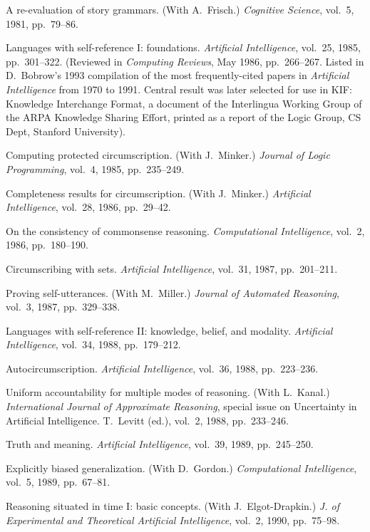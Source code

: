 \paper
A re-evaluation of story grammars.
(With A.~Frisch.)
{\sl Cognitive Science},
vol.~5, 1981, pp.~79--86.

\paper{}
Languages with self-reference I: foundations.
{\sl Artificial Intelligence},
vol.~25, 1985, pp.~301--322.
(Reviewed in {\sl Computing Reviews}, May 1986, pp.~266--267.
Listed in D.~Bobrow's 1993 compilation
of the most frequently-cited papers in {\sl Artificial Intelligence}
from 1970 to 1991. Central result was later selected for use in KIF:
Knowledge Interchange Format, a document of the Interlingua Working
Group of the ARPA Knowledge Sharing Effort, printed as a report of
the Logic Group, CS Dept, Stanford University).

\paper{}
Computing protected circumscription.
(With J.~Minker.)
{\sl Journal of Logic Programming}, vol.~4, 1985, pp.~235--249.

\paper{}
Completeness results for circumscription.
(With J.~Minker.)
{\sl Artificial Intelligence}, vol.~28, 1986, pp.~29--42.

\paper{}
On the consistency of commonsense reasoning.
{\sl Computational Intelligence},
vol.~2, 1986, pp.~180--190.

\paper
Circumscribing with sets.
{\sl Artificial Intelligence},
vol.~31, 1987, pp.~201--211.

\paper
Proving self-utterances.
(With M.~Miller.)
{\sl Journal of Automated Reasoning}, 
vol.~3, 1987, pp.~329--338.

\paper{}
Languages with self-reference II: knowledge, belief, and modality.
{\sl Artificial Intelligence},
vol.~34, 1988, pp.~179--212.

\paper
Autocircumscription.
{\sl Artificial Intelligence},
vol.~36, 1988, pp.~223--236.

\paper
Uniform accountability for multiple modes of reasoning.
(With L.~Kanal.)
{\sl International Journal of Approximate Reasoning},
special issue on Uncertainty in Artificial Intelligence. T.~Levitt (ed.),
vol.~2, 1988, pp.~233--246.

\paper
Truth and meaning.
{\sl Artificial Intelligence},
vol.~39, 1989, pp.~245--250.

\paper
Explicitly biased generalization.
(With D.~Gordon.)
{\sl Computational Intelligence},
vol.~5, 1989, pp.~67--81.

\paper
Reasoning situated in time I: basic concepts.
(With J.~Elgot-Drapkin.)
{\sl J. of Experimental and Theoretical Artificial Intelligence},
vol.~2, 1990, pp.~75--98.

